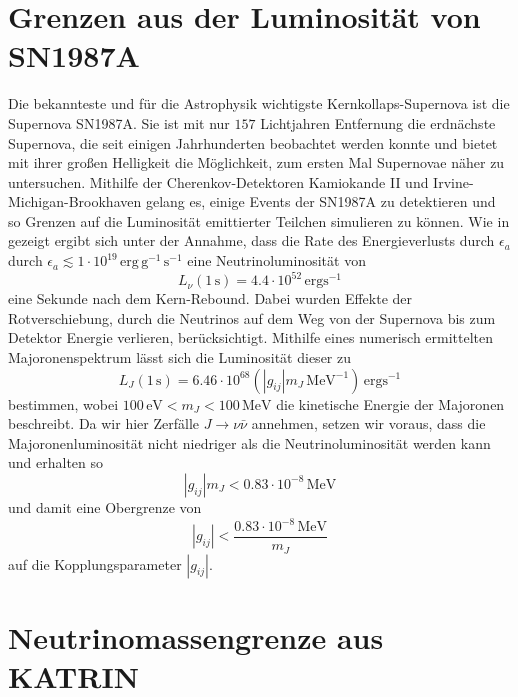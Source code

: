 \section{Grenzen aus der Luminosität von SN1987A}

Die bekannteste und für die Astrophysik wichtigste Kernkollaps-Supernova ist die Supernova SN1987A.
Sie ist mit nur $157$ Lichtjahren Entfernung die erdnächste Supernova, die seit einigen Jahrhunderten beobachtet werden konnte und bietet mit ihrer großen Helligkeit die Möglichkeit, zum ersten Mal Supernovae näher zu untersuchen.
Mithilfe der Cherenkov-Detektoren Kamiokande II und Irvine-Michigan-Brookhaven gelang es, einige Events der SN1987A zu detektieren und so Grenzen auf die Luminosität emittierter Teilchen simulieren zu können.
Wie in \cite{neutrinolumi} gezeigt ergibt sich unter der Annahme, dass die Rate des Energieverlusts durch $\epsilon_a$ durch $\epsilon_a \lesssim 1 \cdot 10^{19} \,\text{erg} \,\text{g}^{-1} \,\si{\second}^{-1}$ 
eine Neutrinoluminosität von
\begin{equation}
    L_\nu (1 \,\si{\second}) = \num{4.4} \cdot 10^{52} \,\text{erg} \si{\second}^{-1}
    \label{eq:neutrinolumi}
\end{equation}
eine Sekunde nach dem Kern-Rebound.
Dabei wurden Effekte der Rotverschiebung, durch die Neutrinos auf dem Weg von der Supernova bis zum Detektor Energie verlieren, berücksichtigt.
Mithilfe eines numerisch ermittelten Majoronenspektrum lässt sich die Luminosität dieser zu
\begin{equation}
    L_J (1 \,\si{\second}) = \num{6.46} \cdot 10^{68} \left(|g_{i j}| m_J \,\si{\mega\eV}^{-1} \right) \,\text{erg} \si{\second}^{-1}
\end{equation}
bestimmen, wobei $100 \,\si{\eV} < m_J < 100 \,\si{\mega\eV}$ die kinetische Energie der Majoronen beschreibt.
Da wir hier Zerfälle $J \rightarrow \nu \bar{\nu}$ annehmen, setzen wir voraus, dass die Majoronenluminosität nicht niedriger als die Neutrinoluminosität werden kann und erhalten so
\begin{equation*}
    |g_{i j}| m_J < \num{0.83} \cdot 10^{-8} \,\si{\mega\eV}
\end{equation*}
und damit eine Obergrenze von
\begin{equation}
    |g_{ij}| < \frac{\num{0.83} \cdot 10^{-8} \,\si{\mega\eV}}{m_J}
    \label{eq:gijlimit}
\end{equation}
auf die Kopplungsparameter $|g_{i j}|$.


\section{Neutrinomassengrenze aus KATRIN}
\label{subsec:KATRIN}

